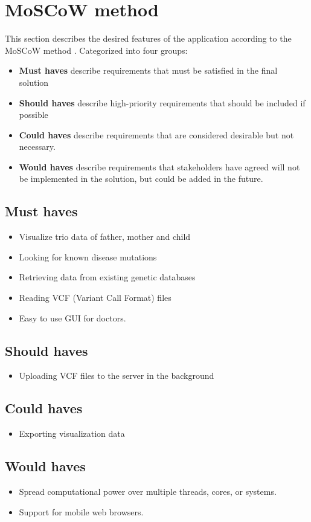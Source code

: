 \section{MoSCoW method}
This section describes the desired features of the application according to the MoSCoW method \cite{brennan2009guide}. Categorized into four groups:
\begin{itemize}
\item \textbf{Must haves} describe requirements that must be satisfied in the final solution
\item \textbf{Should haves} describe high-priority requirements that should be included if possible
\item \textbf{Could haves} describe requirements that are considered desirable but not necessary.
\item \textbf{Would haves} describe requirements that stakeholders have agreed will not be implemented in the solution, but could be added in the future.
\end{itemize}

\subsection{Must haves}
\begin{itemize}
\item Visualize trio data of father, mother and child
\item Looking for known disease mutations
\item Retrieving data from existing genetic databases
\item Reading VCF (Variant Call Format) files 
\item Easy to use GUI for doctors.
\end{itemize}

\subsection{Should haves}
\begin{itemize}
\item Uploading VCF files to the server in the background
\end{itemize}


\subsection{Could haves}
\begin{itemize}
\item Exporting visualization data
\end{itemize}

\subsection{Would haves}
\begin{itemize}
\item Spread computational power over multiple threads, cores, or systems.
\item Support for mobile web browsers.
\end{itemize}